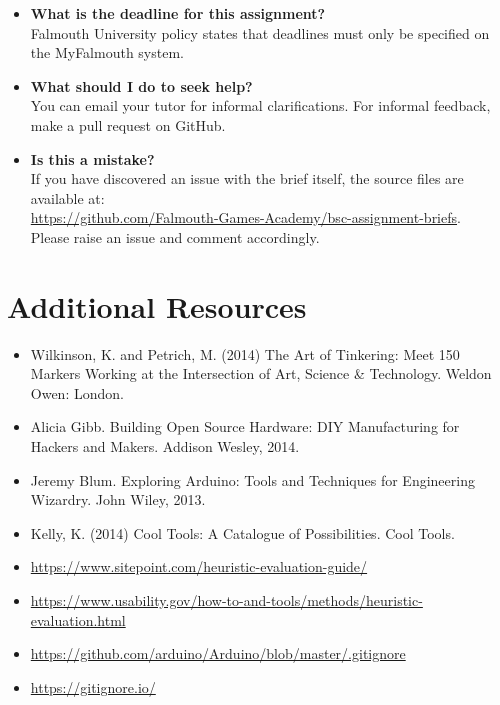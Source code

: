\documentclass{../../fal_assignment}
\begin{document}
\begin{itemize}
	\item 	\textbf{What is the deadline for this assignment?} \\ 
    		Falmouth University policy states that deadlines must only be specified on the MyFalmouth system.
    		
	\item 	\textbf{What should I do to seek help?} \\ 
    		You can email your tutor for informal clarifications. For informal feedback, make a pull request on GitHub. 
    		
    	\item 	\textbf{Is this a mistake?} \\ 	
    		If you have discovered an issue with the brief itself, the source files are available at: \\
    		\url{https://github.com/Falmouth-Games-Academy/bsc-assignment-briefs}.\\
    		 Please raise an issue and comment accordingly.
\end{itemize}

\section*{Additional Resources}

\begin{itemize}
     \item Wilkinson, K. and Petrich, M. (2014) The Art of Tinkering: Meet 150 Markers Working at the Intersection of Art, Science \& Technology. Weldon Owen: London.
    \item Alicia Gibb. Building Open Source Hardware: DIY Manufacturing for Hackers and Makers. Addison Wesley, 2014. 
    \item Jeremy Blum. Exploring Arduino: Tools and Techniques for Engineering Wizardry. John Wiley, 2013. 
    \item Kelly, K. (2014) Cool Tools: A Catalogue of Possibilities. Cool Tools.
    \item \url{https://www.sitepoint.com/heuristic-evaluation-guide/}
    \item \url{https://www.usability.gov/how-to-and-tools/methods/heuristic-evaluation.html}
    \item \url{https://github.com/arduino/Arduino/blob/master/.gitignore}
     \item \url{https://gitignore.io/}
\end{itemize}
\end{document}
